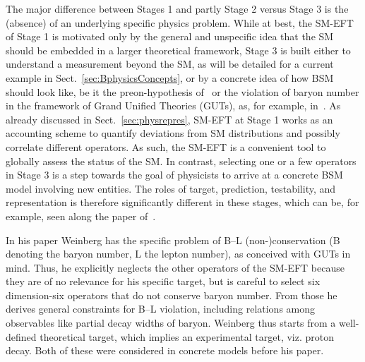 The major difference between Stages 1 and partly Stage 2 versus Stage 3 is the (absence)
of an underlying specific physics problem.
While at best, the SM-EFT of Stage 1 is motivated only by the general and unspecific idea that the
SM should be embedded in a larger theoretical framework,
Stage 3 is built either to understand a measurement beyond the SM, as will be detailed for a
current example in Sect.~\ref{sec:BphysicsConcepts}, or
by a concrete idea of how BSM should look like, be it the preon-hypothesis of~\cite{Eichten:1983hw}
or the violation of baryon number in the framework of Grand Unified Theories (GUTs),
as, for example, in~\cite{Weinberg:1979sa}.   
As already discussed in Sect.~\ref{sec:physrepres},
SM-EFT at Stage 1 works as an accounting scheme to quantify deviations
from SM distributions and possibly correlate different operators.
As such, the SM-EFT is a convenient tool to globally assess the status of the SM.
In contrast, selecting one or a few operators in Stage 3 is a step towards the goal of
physicists to arrive at a concrete BSM model involving new entities.
The roles of target, prediction, testability, and representation is therefore
significantly different in these stages, which can be, for example, seen along the
paper of~\cite{Weinberg:1979sa}.

In his paper Weinberg has the specific problem of B--L (non-)conservation
(B denoting the baryon number, L the lepton number), as conceived with GUTs in mind.
Thus, he explicitly neglects the other operators of the SM-EFT because they are of no 
relevance for his specific target,
but is careful to select six dimension-six operators that do not conserve 
baryon number. 
From those he derives general constraints for B--L violation, including relations
among observables like partial decay widths of baryon.
Weinberg thus starts from a well-defined theoretical target, which implies an experimental
target, viz. proton decay.
Both of these were considered in concrete models before his paper.

